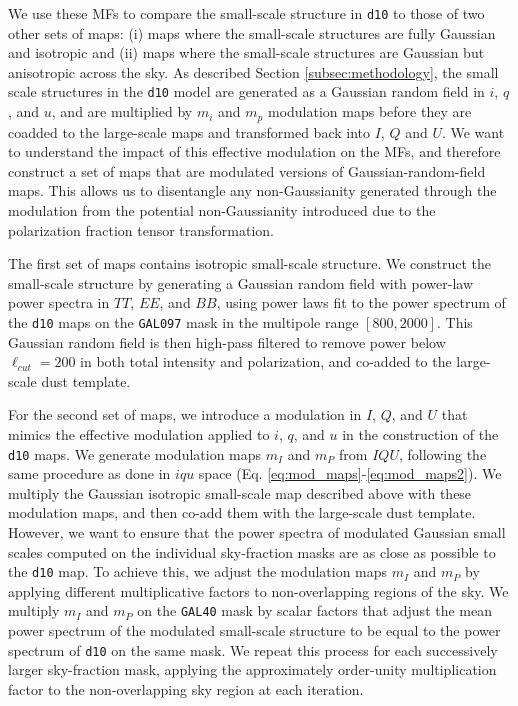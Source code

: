 \documentclass[twocolumn]{aastex631}
\begin{document}
We use these MFs to compare the small-scale structure in \texttt{d10} to those of two other sets of maps: (i) maps where the small-scale structures are fully Gaussian and isotropic and (ii) maps where the small-scale structures are Gaussian but anisotropic across the sky. As described Section \ref{subsec:methodology}, the small scale structures in the \texttt{d10} model are generated as a Gaussian random field in $i$, $q$, and $u$, and are multiplied by $m_i$ and $m_p$ modulation maps before they are coadded to the large-scale maps and transformed back into $I$, $Q$ and $U$. We want to understand the impact of this effective modulation on the MFs, and therefore construct a set of maps that are modulated versions of Gaussian-random-field maps. This allows us to disentangle any non-Gaussianity generated through the modulation from the potential non-Gaussianity introduced due to the polarization fraction tensor transformation.

The first set of maps contains isotropic small-scale structure. We construct the small-scale structure by generating a Gaussian random field with power-law power spectra in $TT$, $EE$, and $BB$, using power laws fit to the power spectrum of the \texttt{d10} maps on the \texttt{GAL097} mask in the multipole range $[800, 2000]$. This Gaussian random field is then high-pass filtered to remove power below $\ell_{cut} = 200$ in both total intensity and polarization, and co-added to the large-scale dust template.

For the second set of maps, we introduce a modulation in $I$, $Q$, and $U$ that mimics the effective modulation applied to $i$, $q$, and $u$ in the construction of the \texttt{d10} maps. We generate modulation maps $m_I$ and $m_P$ from $IQU$, following the same procedure as done in $iqu$ space (Eq. \ref{eq:mod_maps}-\ref{eq:mod_maps2}). We multiply the Gaussian isotropic small-scale map described above with these modulation maps, and then co-add them with the large-scale dust template. However, we want to ensure that the power spectra of modulated Gaussian small scales computed on the individual sky-fraction masks are as close as possible to the \texttt{d10} map. To achieve this, we adjust the modulation maps $m_I$ and $m_P$ by applying different multiplicative factors to non-overlapping regions of the sky. We multiply $m_I$ and $m_P$ on the \texttt{GAL40} mask by scalar factors that adjust the mean power spectrum of the modulated small-scale structure to be equal to the power spectrum of \texttt{d10} on the same mask. We repeat this process for each successively larger sky-fraction mask, applying the approximately order-unity multiplication factor to the non-overlapping sky region at each iteration. 
\end{document}
